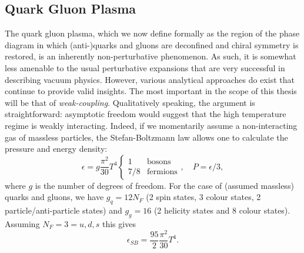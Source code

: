 \documentclass[11pt, a4paper, twoside]{book}
\begin{document}
\subsection{Quark Gluon Plasma}
\label{sec:QGP}
The quark gluon plasma, which we now define formally as the region of the phase diagram in which (anti-)quarks and gluons are deconfined and chiral symmetry is restored, is an inherently non-perturbative phenomenon. As such, it is somewhat less amenable to the usual perturbative expansions that are very successful in describing vacuum physics. However, various analytical approaches do exist that continue to provide valid insights. The most important in the scope of this thesis will be that of \emph{weak-coupling}. Qualitatively speaking, the argument is straightforward: asymptotic freedom would suggest that the high temperature regime is weakly interacting. Indeed, if we momentarily assume a non-interacting gas of massless particles, the Stefan-Boltzmann law allows one to calculate the pressure and energy density:
\begin{equation}
\label{eq:SBres}
\epsilon=g\frac{\pi^2}{30}T^4\begin{cases}
    1 & \text{bosons}\\
    7/8 & \text{fermions}
  \end{cases},\quad P=\epsilon/3,
\end{equation}
where \(g\) is the number of degrees of freedom. For the case of (assumed massless) quarks and gluons, we have \(g_q=12N_F\) (2 spin states, 3 colour states, 2 particle/anti-particle states) and \(g_g=16\) (2 helicity states and 8 colour states). Assuming \(N_F=3=u,d,s\) this gives
\begin{equation}
\label{eq:SB_pres}
\epsilon_{SB}=\frac{95}{2}\frac{\pi^2}{30}T^4.
\end{equation}
\end{document}
